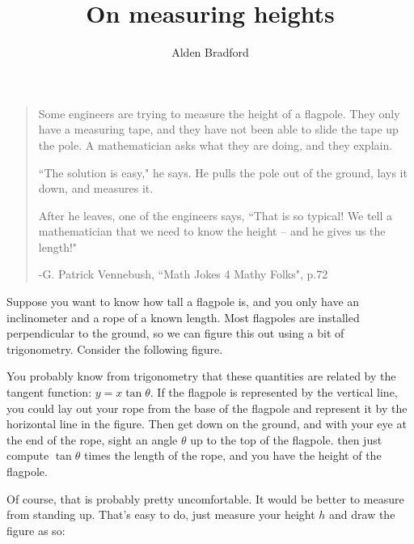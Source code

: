 \documentclass{article}
\title{On measuring heights}
\author{Alden Bradford}
\begin{document}
\maketitle

\begin{quote}
Some engineers are trying to measure the height of a flagpole. They only have a measuring tape, and they have not been able to slide the tape up the pole. A mathematician asks what they are doing, and they explain.

``The solution is easy," he says. He pulls the pole out of the ground, lays it down, and measures it.

After he leaves, one of the engineers says, ``That is so typical! We tell a mathematician that we need to know the height -- and he gives us the length!"

\hfill -G. Patrick Vennebush, ``Math Jokes 4 Mathy Folks", p.72
\end{quote}

Suppose you want to know how tall a flagpole is, and you only have an inclinometer and a rope of a known length. Most flagpoles are installed perpendicular to the ground, so we can figure this out using a bit of trigonometry. Consider the following figure.

\begin{figure}[h!]
\centering
{}
\end{figure}

You probably know from trigonometry that these quantities are related by the tangent function: $y = x \tan \theta$. If the flagpole is represented by the vertical line, you could lay out your rope from the base of the flagpole and represent it by the horizontal line in the figure. Then get down on the ground, and with your eye at the end of the rope, sight an angle $\theta$ up to the top of the flagpole. then just compute $\tan\theta$ times the length of the rope, and you have the height of the flagpole.

Of course, that is probably pretty uncomfortable. It would be better to measure from standing up. That's easy to do, just measure your height $h$ and draw the figure as so:
\begin{figure}[h!]
\centering
{}
\end{figure}
\end{document}
